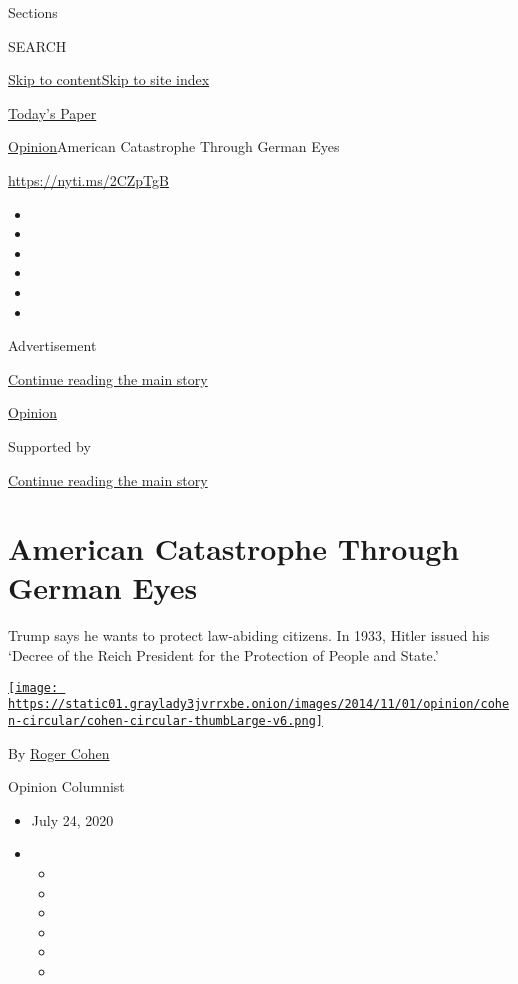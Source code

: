 Sections

SEARCH

\protect\hyperlink{site-content}{Skip to
content}\protect\hyperlink{site-index}{Skip to site index}

\href{https://myaccount.nytimes3xbfgragh.onion/auth/login?response_type=cookie\&client_id=vi}{}

\href{https://www.nytimes3xbfgragh.onion/section/todayspaper}{Today's
Paper}

\href{/section/opinion}{Opinion}\textbar{}American Catastrophe Through
German Eyes

\url{https://nyti.ms/2CZpTgB}

\begin{itemize}
\item
\item
\item
\item
\item
\item
\end{itemize}

Advertisement

\protect\hyperlink{after-top}{Continue reading the main story}

\href{/section/opinion}{Opinion}

Supported by

\protect\hyperlink{after-sponsor}{Continue reading the main story}

\hypertarget{american-catastrophe-through-german-eyes}{%
\section{American Catastrophe Through German
Eyes}\label{american-catastrophe-through-german-eyes}}

Trump says he wants to protect law-abiding citizens. In 1933, Hitler
issued his `Decree of the Reich President for the Protection of People
and State.'

\href{https://www.nytimes3xbfgragh.onion/by/roger-cohen}{\texttt{[image: https://static01.graylady3jvrrxbe.onion/images/2014/11/01/opinion/cohen-circular/cohen-circular-thumbLarge-v6.png]}}

By \href{https://www.nytimes3xbfgragh.onion/by/roger-cohen}{Roger Cohen}

Opinion Columnist

\begin{itemize}
\item
  July 24, 2020
\item
  \begin{itemize}
  \item
  \item
  \item
  \item
  \item
  \item
  \end{itemize}
\end{itemize}

